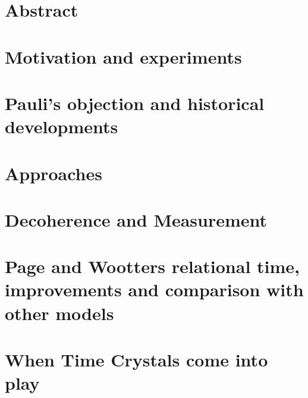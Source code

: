




\maketitle

\tableofcontents

\chapter*{Abstract}


\iftodo
\chapter{Motivation and experiments}

\fi

\chapter{Pauli's objection and historical developments}


\iftodo
\chapter{Approaches}

\fi

\chapter{Decoherence and Measurement}








\chapter{Page and Wootters relational time, improvements and comparison with other models}




\iftodo
\chapter{When Time Crystals come into play}

\fi

